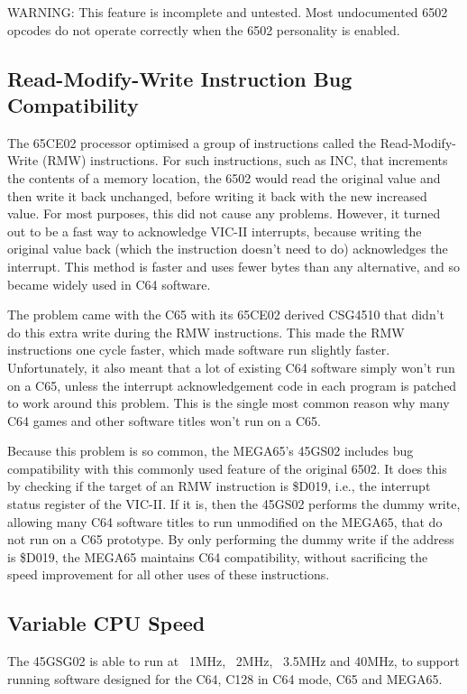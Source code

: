 WARNING: This feature is incomplete and untested.  Most undocumented 6502 opcodes do not operate correctly when the 6502
personality is enabled.

\subsection{Read-Modify-Write Instruction Bug Compatibility}

The 65CE02 processor optimised a group of instructions called the Read-Modify-Write (RMW)
instructions.  For such instructions, such as INC, that increments the contents of a memory
location, the 6502 would read the original value and then write it back unchanged, before
writing it back with the new increased value.  For most purposes, this did not cause any
problems. However, it turned out to be a fast way to acknowledge VIC-II interrupts, because
writing the original value back (which the instruction doesn't need to do) acknowledges
the interrupt.  This method is faster and uses fewer bytes than any alternative, and so
became widely used in C64 software.

The problem came with the C65 with its 65CE02 derived CSG4510 that didn't do this extra write
during the RMW instructions.  This made the RMW instructions one cycle faster, which made
software run slightly faster. Unfortunately, it also meant that a lot of existing C64 software
simply won't run on a C65, unless the interrupt acknowledgement code in each program is patched
to work around this problem. This is the single most common reason why many C64 games and other
software titles won't run on a C65.

Because this problem is so common, the MEGA65's 45GS02 includes bug compatibility with this
commonly used feature of the original 6502.  It does this by checking if the target of an RMW
instruction is \$D019, i.e., the interrupt status register of the VIC-II.  If it is, then
the 45GS02 performs the dummy write, allowing many C64 software titles to run unmodified on the
MEGA65, that do not run on a C65 prototype.  By only performing the dummy write if the address
is \$D019, the MEGA65 maintains C64 compatibility, without sacrificing the speed improvement
for all other uses of these instructions.

\subsection{Variable CPU Speed}

The 45GSG02 is able to run at ~1MHz, ~2MHz, ~3.5MHz and 40MHz, to support running software
designed for the C64, C128 in C64 mode, C65 and MEGA65.

